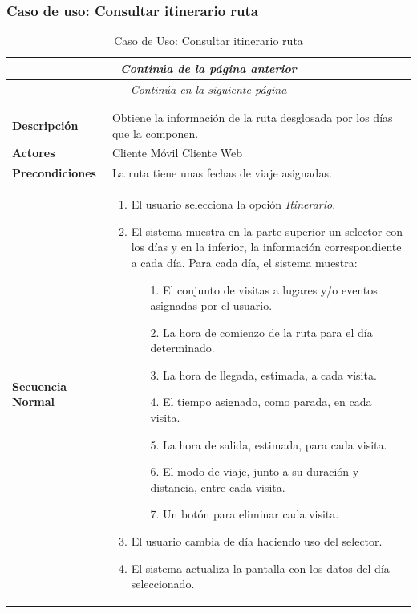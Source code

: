 \subsubsection*{Caso de uso: Consultar itinerario ruta }
\begin{longtable}{| p{4cm} | p{10cm} |}
\endfirsthead
\multicolumn{2}{c}{\textit{Continúa de la página anterior}}\\[12pt]
\hline
\endhead
\hline
\multicolumn{2}{c}{\textit{Continúa en la siguiente página}} \\
\endfoot
\hline
\caption{Caso de Uso: Consultar itinerario ruta}\label{fig:1}\\
\endlastfoot


\hline
\multicolumn{2}{|c|}{\textbf{CU$<$13$>$ - Consultar Itinerario Ruta}} \\

\hline
\textbf{Descripción} &
Obtiene la información de la ruta desglosada por los días que la componen.\\

\hline
\textbf{Actores} &
Cliente Móvil\newline
Cliente Web\\

\hline
\textbf{Precondiciones} &
La ruta tiene unas fechas de viaje asignadas.\\

\hline
\textbf{Secuencia Normal} &\mbox{}\par\vspace{-\baselineskip}
\begin{enumerate}[leftmargin=0.7cm, topsep=0.1cm]
\item El usuario selecciona la opción \textit{Itinerario}.
\item El sistema muestra en la parte superior un selector con los días y en la inferior, la información correspondiente a cada día. Para cada día, el sistema muestra:
	\begin{itemize}
	\item [1.] El conjunto de visitas a lugares y/o eventos asignadas por el usuario.
	\item [2.] La hora de comienzo de la ruta para el día determinado.
	\item [3.] La hora de llegada, estimada, a cada visita.
	\item [4.] El tiempo asignado, como parada, en cada visita.
	\item [5.] La hora de salida, estimada, para cada visita.
	\item [6.] El modo de viaje, junto a su duración y distancia, entre cada visita.
	\item [7.] Un botón para eliminar cada visita.
	\end{itemize}
\item El usuario cambia de día haciendo uso del selector.
\item El sistema actualiza la pantalla con los datos del día seleccionado.
\end{enumerate}



\end{longtable}
